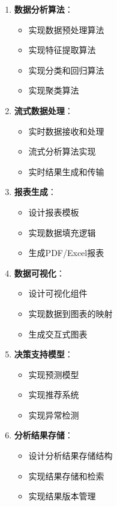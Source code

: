 \documentclass[a4paper,12pt]{article}
\begin{document}
\begin{enumerate}
  \item \textbf{数据分析算法}：
    \begin{itemize}
      \item 实现数据预处理算法
      \item 实现特征提取算法
      \item 实现分类和回归算法
      \item 实现聚类算法
    \end{itemize}
  
  \item \textbf{流式数据处理}：
    \begin{itemize}
      \item 实时数据接收和处理
      \item 流式分析算法实现
      \item 实时结果生成和传输
    \end{itemize}
  
  \item \textbf{报表生成}：
    \begin{itemize}
      \item 设计报表模板
      \item 实现数据填充逻辑
      \item 生成PDF/Excel报表
    \end{itemize}
  
  \item \textbf{数据可视化}：
    \begin{itemize}
      \item 设计可视化组件
      \item 实现数据到图表的映射
      \item 生成交互式图表
    \end{itemize}
  
  \item \textbf{决策支持模型}：
    \begin{itemize}
      \item 实现预测模型
      \item 实现推荐系统
      \item 实现异常检测
    \end{itemize}
  
  \item \textbf{分析结果存储}：
    \begin{itemize}
      \item 设计分析结果存储结构
      \item 实现结果存储和检索
      \item 实现结果版本管理
    \end{itemize}
\end{enumerate}
\end{document}
